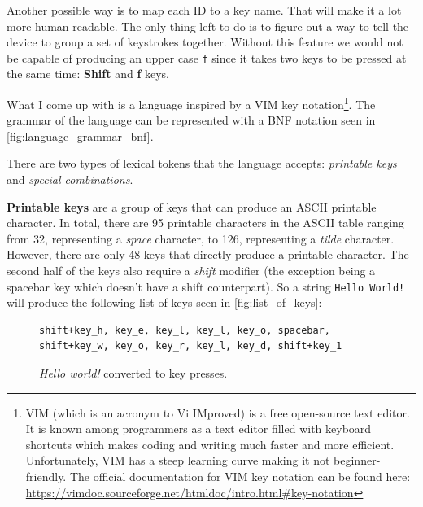 Another possible way is to map each ID to a key name. That will make it a lot more human-readable. The only thing left to do is to figure out a way to tell the device to group a set of keystrokes together. Without this feature we would not be capable of producing an upper case \verb|f| since it takes two keys to be pressed at the same time: \textbf{Shift} and \textbf{f} keys.

What I come up with is a language inspired by a VIM key notation\footnote{VIM (which is an acronym to Vi IMproved) is a free open-source text editor. It is known among programmers as a text editor filled with keyboard shortcuts which makes coding and writing much faster and more efficient. Unfortunately, VIM has a steep learning curve making it not beginner-friendly. The official documentation for VIM key notation can be found here: \url{https://vimdoc.sourceforge.net/htmldoc/intro.html\#key-notation}}. The grammar of the language can be represented with a BNF notation seen in \autoref{fig:language_grammar_bnf}.

There are two types of lexical tokens that the language accepts: \emph{printable keys} and \emph{special combinations}.

\textbf{Printable keys} are a group of keys that can produce an ASCII printable character. In total, there are 95 printable characters in the ASCII table ranging from 32, representing a \emph{space} character, to 126, representing a \emph{tilde} character. However, there are only 48 keys that directly produce a printable character. The second half of the keys also require a \emph{shift} modifier (the exception being a spacebar key which doesn't have a shift counterpart). So a string \verb|Hello World!| will produce the following list of keys seen in \autoref{fig:list_of_keys}:

\begin{figure}[ht]
\centering
\begin{varwidth}{\linewidth}
\begin{verbatim}
shift+key_h, key_e, key_l, key_l, key_o, spacebar,
shift+key_w, key_o, key_r, key_l, key_d, shift+key_1
\end{verbatim}
\end{varwidth}
\caption{\emph{Hello world!} converted to key presses.}
\label{fig:list_of_keys}
\end{figure}


